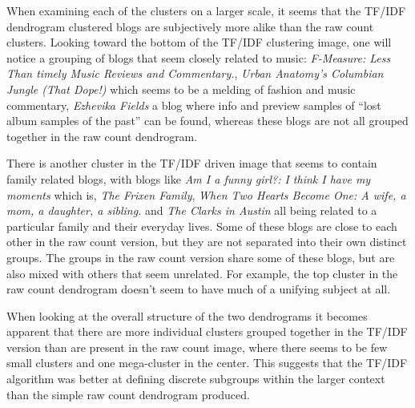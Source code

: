 When examining each of the clusters on a larger scale, it seems that the TF/IDF dendrogram clustered blogs are subjectively more alike than the raw count clusters. Looking toward the bottom of the TF/IDF clustering image, one will notice a grouping of blogs that seem closely related to music: {\it F-Measure: Less Than timely Music Reviews and Commentary.}, {\it Urban Anatomy's Columbian Jungle (That Dope!)} which seems to be a melding of fashion and music commentary, {\it Ezhevika Fields} a blog where info and preview samples of ``lost album samples of the past'' can be found, whereas these blogs are not all grouped together in the raw count dendrogram.

There is another cluster in the TF/IDF driven image that seems to contain family related blogs, with blogs like {\it Am I a funny girl?: I think I have my moments} which is, {\it The Frixen Family}, {\it When Two Hearts Become One: A wife, a mom, a daughter, a sibling.} and {\it The Clarks in Austin} all being related to a particular family and their everyday lives. Some of these blogs are close to each other in the raw count version, but they are not separated into their own distinct groups. The groups in the raw count version share some of these blogs, but are also mixed with others that seem unrelated. For example, the top cluster in the raw count dendrogram doesn't seem to have much of a unifying subject at all.

When looking at the overall structure of the two dendrograms it becomes apparent that there are more individual clusters grouped together in the TF/IDF version than are present in the raw count image, where there seems to be few small clusters and one mega-cluster in the center. This suggests that the TF/IDF algorithm was better at defining discrete subgroups within the larger context than the simple raw count dendrogram produced.

